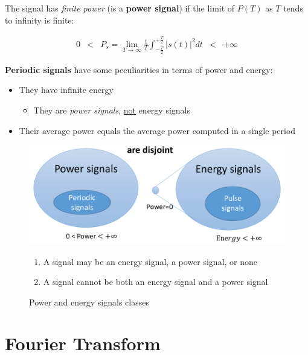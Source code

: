 The signal has \textit{finite power} (is a \textbf{power signal}) if the limit of $P(T)$ as $T$ tends to infinity is finite:

\begin{align}
   0 & < & P_s = \lim_{T \to \infty} \frac{1}{T} \int_{-\frac{T}{2}}^{+\frac{T}{2}} |s(t)|^2 dt & < & +\infty
\end{align}

\textbf{Periodic signals} have some peculiarities in terms of power and energy:
\begin{itemize}
   \item They have infinite energy
   \begin{itemize}
      \item They are \textit{power signals}, \ul{not} energy signals
   \end{itemize}
   \item Their average power equals the average power computed in a single period 
\end{itemize} 

\begin{figure}[htbp]
   \centering
   \includegraphics{images/powerenergy_signals.png}
   \caption{Power and energy signals classes}
   \begin{enumerate}
      \item 
      A signal may be an energy signal, a power signal, or none
      \item A signal cannot be both an energy signal and a power signal
   \end{enumerate}
      \label{fig:powerenergy_signals}
\end{figure}

\section{Fourier Transform}
